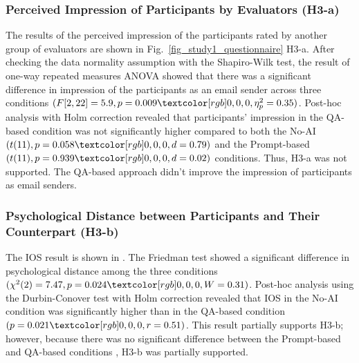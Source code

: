 \subsubsection{Perceived Impression of Participants by Evaluators (H3-a)}
\label{sec:result1_impression}
The results of the perceived impression of the participants rated by another group of evaluators are shown in Fig.~\ref{fig_study1_questionnaire} H3-a.
After checking the data normality assumption with the Shapiro-Wilk test, the result of one-way repeated measures ANOVA showed that there was a significant difference in impression of the participants as an email sender across three conditions $(F[2, 22]=5.9, p=0.009\red{, \eta_p^2=0.35})$. 
Post-hoc analysis with Holm correction revealed that participants' impression in the QA-based condition was not significantly higher compared to both the No-AI $(t(11), p=0.058\red{, d=0.79})$ and the Prompt-based $(t(11), p=0.939\red{, d=0.02})$ conditions.
Thus, H3-a was not supported.
The QA-based approach didn't improve the impression of participants as email senders.

\subsubsection{Psychological Distance between Participants and Their Counterpart (H3-b)}
\label{sec:result1_psychological_distance}
The IOS result is shown in .
The Friedman test showed a significant difference in psychological distance among the three conditions $(\chi^2(2)=7.47, p=0.024\red{, W=0.31})$.
Post-hoc analysis using the Durbin-Conover test with Holm correction revealed that IOS in the No-AI condition was significantly higher than in the QA-based condition $(p=0.021\red{, r=0.51})$. 
This result partially supports H3-b; however, because there was no significant difference between the Prompt-based and QA-based conditions , H3-b was partially supported.


